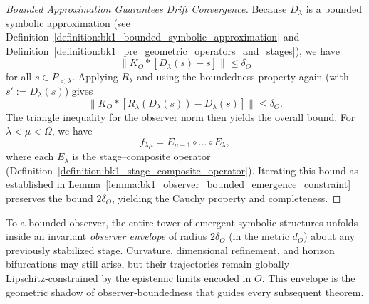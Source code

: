 \begin{proof}[Bounded Approximation Guarantees Drift Convergence]
\label{proof:bk1_bounded_drift_approximation}
Because \(D_\lambda\) is a bounded symbolic approximation (see Definition~\ref{definition:bk1_bounded_symbolic_approximation} and Definition~\ref{definition:bk1_pre_geometric_operators_and_stages}), we have
\[
  \lVert K_O*[D_\lambda(s)-s]\rVert \le \delta_O
\]
for all \(s\in P_{<\lambda}\). Applying \(R_\lambda\) and using the boundedness property again (with \(s' := D_\lambda(s)\)) gives
\[
  \lVert K_O*[R_\lambda(D_\lambda(s))-D_\lambda(s)]\rVert \le \delta_O.
\]
The triangle inequality for the observer norm then yields the overall bound. For \(\lambda<\mu<\Omega\), we have
\[
f_{\lambda\mu} = E_{\mu-1}\circ\dots\circ E_\lambda,
\]
where each \(E_\lambda\) is the stage–composite operator (Definition~\ref{definition:bk1_stage_composite_operator}). Iterating this bound as established in Lemma~\ref{lemma:bk1_observer_bounded_emergence_constraint} preserves the bound \(2\delta_O\), yielding the Cauchy property and completeness.
\end{proof}
\begin{scholium}
\label{scholium:bk1_emergence_envelope}
To a bounded observer, the entire tower of emergent symbolic structures unfolds inside an invariant
\emph{observer envelope} of radius \(2\delta_O\) (in the metric \(d_O\)) about any previously
stabilized stage.  Curvature, dimensional refinement, and horizon bifurcations may still arise, but
their trajectories remain globally Lipschitz‑constrained by the epistemic limits encoded in
\(O\).  This envelope is the geometric shadow of observer‑boundedness that guides every subsequent
theorem.
\end{scholium}
